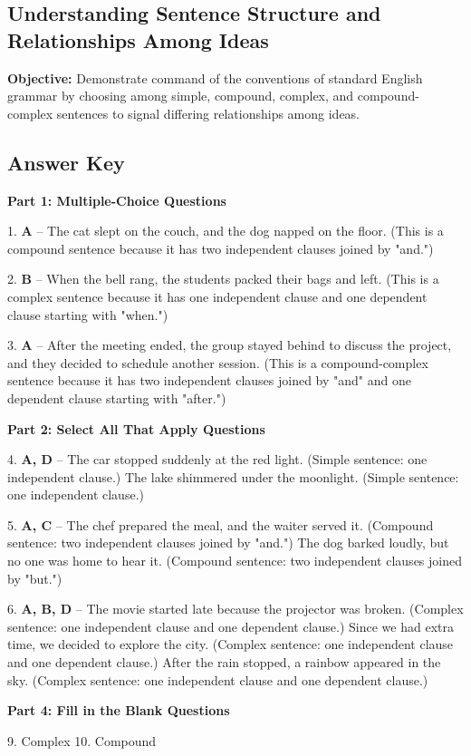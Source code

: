 \documentclass[12pt]{article}
\begin{document}
\subsection*{Understanding Sentence Structure and Relationships Among Ideas}
\onehalfspacing

\begin{tcolorbox}[colframe=black!40, colback=gray!0, title=Learning Objective]
\textbf{Objective:} Demonstrate command of the conventions of standard English grammar by choosing among simple, compound, complex, and compound-complex sentences to signal differing relationships among ideas.
\end{tcolorbox}


\subsection*{Answer Key}

\textbf{Part 1: Multiple-Choice Questions}

1. \textbf{A} – The cat slept on the couch, and the dog napped on the floor. (This is a compound sentence because it has two independent clauses joined by "and.")

2. \textbf{B} – When the bell rang, the students packed their bags and left. (This is a complex sentence because it has one independent clause and one dependent clause starting with "when.")

3. \textbf{A} – After the meeting ended, the group stayed behind to discuss the project, and they decided to schedule another session. (This is a compound-complex sentence because it has two independent clauses joined by "and" and one dependent clause starting with "after.")

\textbf{Part 2: Select All That Apply Questions}

4. \textbf{A, D} – The car stopped suddenly at the red light. (Simple sentence: one independent clause.)  
The lake shimmered under the moonlight. (Simple sentence: one independent clause.)

5. \textbf{A, C} – The chef prepared the meal, and the waiter served it. (Compound sentence: two independent clauses joined by "and.")  
The dog barked loudly, but no one was home to hear it. (Compound sentence: two independent clauses joined by "but.")

6. \textbf{A, B, D} – The movie started late because the projector was broken. (Complex sentence: one independent clause and one dependent clause.)  
Since we had extra time, we decided to explore the city. (Complex sentence: one independent clause and one dependent clause.)  
After the rain stopped, a rainbow appeared in the sky. (Complex sentence: one independent clause and one dependent clause.)

\textbf{Part 4: Fill in the Blank Questions}

9. Complex  
10. Compound
\end{document}
